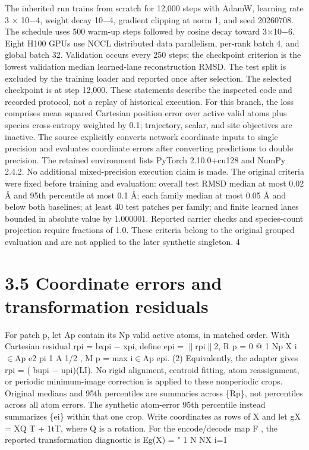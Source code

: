 \documentclass[11pt]{article}
\begin{document}
The inherited run trains from scratch for 12,000 steps with AdamW, learning rate 3 \ensuremath{\times} 10\ensuremath{-}4, weight
decay 10\ensuremath{-}4, gradient clipping at norm 1, and seed 20260708. The schedule uses 500 warm-up steps
followed by cosine decay toward 3\ensuremath{\times}10\ensuremath{-}6. Eight H100 GPUs use NCCL distributed data parallelism,
per-rank batch 4, and global batch 32. Validation occurs every 250 steps; the checkpoint criterion
is the lowest validation median learned-lane reconstruction RMSD. The test split is excluded by the
training loader and reported once after selection. The selected checkpoint is at step 12,000. These
statements describe the inspected code and recorded protocol, not a replay of historical execution.
For this branch, the loss comprises mean squared Cartesian position error over active valid atoms
plus species cross-entropy weighted by 0.1; trajectory, scalar, and site objectives are inactive. The
source explicitly converts network coordinate inputs to single precision and evaluates coordinate
errors after converting predictions to double precision. The retained environment lists PyTorch
2.10.0+cu128 and NumPy 2.4.2. No additional mixed-precision execution claim is made.
The original criteria were fixed before training and evaluation: overall test RMSD median at
most 0.02 Å and 95th percentile at most 0.1 Å; each family median at most 0.05 Å and below
both baselines; at least 40 test patches per family; and finite learned lanes bounded in absolute
value by 1.000001. Reported carrier checks and species-count projection require fractions of 1.0.
These criteria belong to the original grouped evaluation and are not applied to the later synthetic
singleton.
4


\section*{3.5 Coordinate errors and transformation residuals}

For patch p, let Ap contain its Np valid active atoms, in matched order. With Cartesian residual
rpi = bxpi \ensuremath{-} xpi, define
epi = \ensuremath{\parallel}rpi\ensuremath{\parallel}2, R p =
0
@ 1
Np
X
i\ensuremath{\in}Ap
e2
pi
1
A
1/2
, M p = max
i\ensuremath{\in}Ap
epi. (2)
Equivalently, the adapter gives rpi = ( bupi \ensuremath{-} upi)(LI). No rigid alignment, centroid fitting, atom
reassignment, or periodic minimum-image correction is applied to these nonperiodic crops. Original
medians and 95th percentiles are summaries across \{Rp\}, not percentiles across all atom errors.
The synthetic atom-error 95th percentile instead summarizes \{ei\} within that one crop.
Write coordinates as rows of X and let gX = XQ T + 1tT, where Q is a rotation. For the
encode/decode map F , the reported transformation diagnostic is
Eg(X) =
"
1
N
NX
i=1
\end{document}
